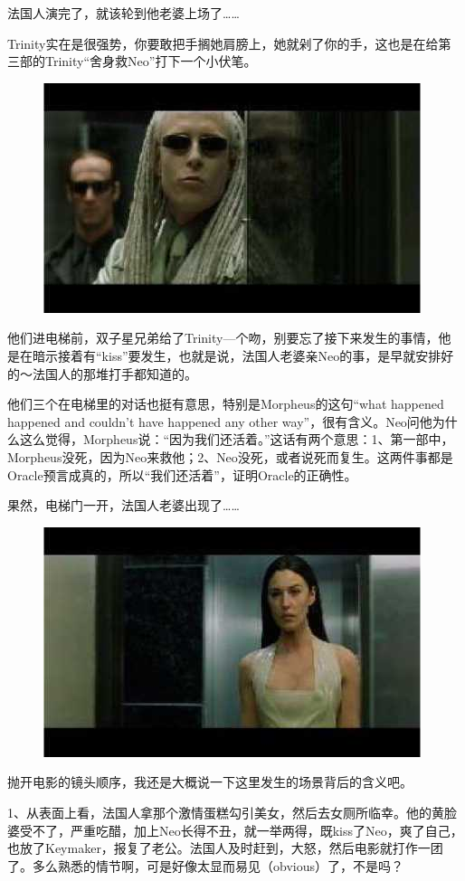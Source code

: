 \documentclass{ctexart}
\begin{document}
法国人演完了，就该轮到他老婆上场了……

Trinity实在是很强势，你要敢把手搁她肩膀上，她就剁了你的手，这也是在给第三部的Trinity“舍身救Neo”打下一个小伏笔。

\begin{figure}[htb]
\centering
\includegraphics[width=0.5\linewidth]{fig/read_reloaded-101}
\end{figure}

他们进电梯前，双子星兄弟给了Trinity—个吻，别要忘了接下来发生的事情，他是在暗示接着有“kiss”要发生，也就是说，法国人老婆亲Neo的事，是早就安排好的～法国人的那堆打手都知道的。

他们三个在电梯里的对话也挺有意思，特别是Morpheus的这句“what happened happened and couldn't have happened any other way”，很有含义。Neo问他为什么这么觉得，Morpheus说：“因为我们还活着。”这话有两个意思：1、第一部中，Morpheus没死，因为Neo来救他；2、Neo没死，或者说死而复生。这两件事都是Oracle预言成真的，所以“我们还活着”，证明Oracle的正确性。

果然，电梯门一开，法国人老婆出现了……

\begin{figure}[htb]
\centering
\includegraphics[width=0.5\linewidth]{fig/read_reloaded-102}
\end{figure}

抛开电影的镜头顺序，我还是大概说一下这里发生的场景背后的含义吧。

1、从表面上看，法国人拿那个激情蛋糕勾引美女，然后去女厕所临幸。他的黄脸婆受不了，严重吃醋，加上Neo长得不丑，就一举两得，既kiss了Neo，爽了自己，也放了Keymaker，报复了老公。法国人及时赶到，大怒，然后电影就打作一团了。多么熟悉的情节啊，可是好像太显而易见（obvious）了，不是吗？
\end{document}
